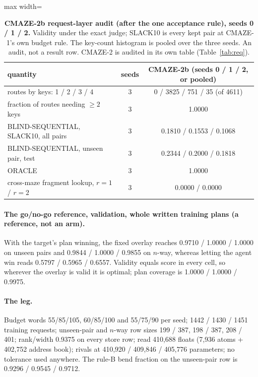 \documentclass{article} %
\begin{document}
\begin{table}[h]
\centering\small
\caption{\textbf{CMAZE-2b request-layer audit (after the one acceptance rule), seeds 0 / 1 / 2.} %
Validity under the exact judge; SLACK10 is every kept pair at CMAZE-1's own budget rule. The
key-count histogram is pooled over the three seeds. An audit, not a result row. CMAZE-2 is
audited in its own table (Table~\ref{tab:req}).}
\label{tab:req2b}
\setlength{\tabcolsep}{3pt}
\begin{adjustbox}{max width=\linewidth}\begin{tabular}{lcc}
\toprule
quantity & seeds & CMAZE-2b (seeds 0 / 1 / 2, or pooled) \\
\midrule
routes by keys: 1 / 2 / 3 / 4 & 3 & 0 / 3825 / 751 / 35 (of 4611) \\
fraction of routes needing $\ge2$ keys & 3 & 1.0000 \\
BLIND-SEQUENTIAL, SLACK10, all pairs & 3 & 0.1810 / 0.1553 / 0.1068 \\
BLIND-SEQUENTIAL, unseen pair, test & 3 & 0.2344 / 0.2000 / 0.1818 \\
ORACLE & 3 & 1.0000 \\
cross-maze fragment lookup, $r=1$ / $r=2$ & 3 & 0.0000 / 0.0000 \\
\bottomrule
\end{tabular}\end{adjustbox}
\end{table}



\paragraph{The go/no-go reference, validation, whole written training plans (a reference, not an
arm).} With the target's plan winning, the fixed overlay reaches 0.9710 / 1.0000 / 1.0000 on unseen
pairs and 0.9844 / 1.0000 / 0.9855 on $n$-way, whereas letting the agent win reads 0.5797 / 0.5965 /
0.6557. Validity equals score in every cell, so wherever the overlay is valid it is optimal; plan
coverage is 1.0000 / 1.0000 / 0.9975. %

\paragraph{The leg.} Budget words 55/85/105, 60/85/100 and 55/75/90 per seed; 1442 / 1430 / 1451
training requests; unseen-pair and $n$-way row sizes 199 / 387, 198 / 387, 208 / 401; rank/width
0.9375 on every store row; read 410,688 floats (7,936 atoms + 402,752 address book); rivals at
410,920 / 409,846 / 405,776 parameters; no tolerance used anywhere. The rule-B bend fraction on the
unseen-pair row is 0.9296 / 0.9545 / 0.9712. %
\end{document}
